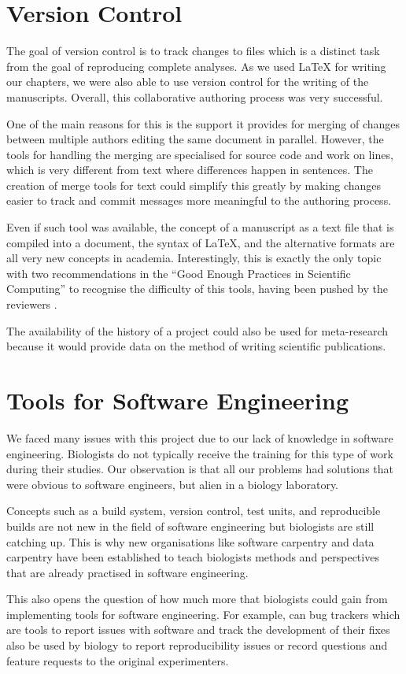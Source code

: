 \section{Version Control}

The goal of version control is to track changes to files which is a
distinct task from the goal of reproducing complete analyses.
As we used \LaTeX{} for
writing our chapters, we were also able to use version control for
the writing of the manuscripts.
Overall, this collaborative authoring process was very successful.

One of the main reasons for this
is the support it provides for merging of changes between multiple authors
editing the same document in parallel.  However, the tools for
handling the merging are specialised for source code and work on
lines, which is very different from text where differences
happen in sentences.  The creation of merge tools for text could
simplify this greatly by making changes easier to track and commit
messages more meaningful to the authoring process.

Even if such tool was available, the concept of a manuscript as a text
file that is compiled into a document, the syntax of \LaTeX, and the
alternative formats are all very new concepts in academia.
Interestingly, this is
exactly the only topic with two recommendations in the ``Good Enough
Practices in Scientific Computing'' to recognise the difficulty of
this tools, having been pushed by the reviewers .

The availability of the history of a project
could also be used for meta-research because it would provide data on the
method of writing scientific publications.

\section{Tools for Software Engineering}

We faced many issues with this project due to our lack of knowledge in
software engineering.  Biologists do not typically receive the training for this
type of work during their studies.  Our observation is that all our
problems had solutions that were obvious to software engineers, but
alien in a biology laboratory.

Concepts such as a build system, version control, test units,
and reproducible builds are not new in the field of software engineering but
biologists are still catching up.  This is why new
organisations like software carpentry and data carpentry
have been
established to teach biologists
methods and perspectives that are already practised in software engineering.

This also opens the question of how much more that biologists could
gain from implementing
tools for software engineering.  For example, can
bug trackers which are tools to report issues with software and track the
development of their fixes also be used by biology to report
reproducibility issues or record questions and
feature requests to the original experimenters.

